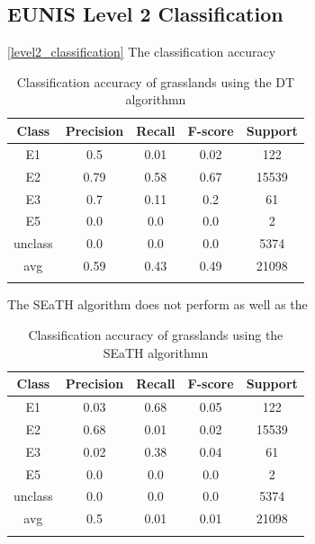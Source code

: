 \documentclass[authoryear, review,12pt,number]{elsarticle}
\begin{document}
\subsection{EUNIS Level 2 Classification}
\ref{level2_classification}
The classification accuracy
\begin{table}
\begin{tabular}{c c c c c}
Class & Precision & Recall & F-score & Support\\
\hline
E1 & 0.5 & 0.01 & 0.02 & 122\\
E2 & 0.79 & 0.58 & 0.67 & 15539\\
E3 & 0.7 & 0.11 & 0.2 & 61\\
E5 & 0.0 & 0.0 & 0.0 & 2\\
unclass & 0.0 & 0.0 & 0.0 & 5374\\
avg & 0.59 & 0.43 & 0.49 & 21098\\
\label{fig_dt_lvl2_classification}
\end{tabular}
\caption{Classification accuracy of grasslands using the DT algorithmn}
\end{table}

The SEaTH algorithm does not perform as well as the 
\begin{table}
\begin{tabular}{c c c c c}
Class & Precision & Recall & F-score & Support\\
\hline
E1 & 0.03 & 0.68 & 0.05 & 122\\
E2 & 0.68 & 0.01 & 0.02 & 15539\\
E3 & 0.02 & 0.38 & 0.04 & 61\\
E5 & 0.0 & 0.0 & 0.0 & 2\\
unclass & 0.0 & 0.0 & 0.0 & 5374\\
avg & 0.5 & 0.01 & 0.01 & 21098\\
\label{fig_seath_lvl2_classification}
\end{tabular}
\caption{Classification accuracy of grasslands using the SEaTH algorithmn}
\end{table}
\end{document}
